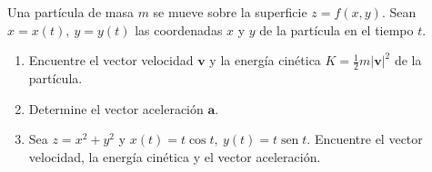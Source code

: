 \item Una partícula de masa $m$ se mueve sobre la superficie $z = f(x, y)$. Sean $x = x(t), \ y = y(t)$ las coordenadas $x$ y $y$ de la partícula en el tiempo $t$.
    \begin{enumerate}
        \item[(a)] Encuentre el vector velocidad $\mathbf{v}$ y la energía cinética $K = \frac{1}{2}m|\mathbf{v}|^2$ de la partícula.
        \item[(b)] Determine el vector aceleración $\mathbf{a}$.
        \item[(c)] Sea $z = x^2 + y^2$ y $x(t) = t \cos t, \ y(t) = t \operatorname{sen} t$. Encuentre el vector velocidad, la energía cinética y el vector aceleración.
    \end{enumerate}

